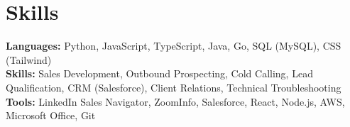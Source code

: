 \documentclass[11pt]{article}       %
\begin{document}

\vspace{-18.5pt}


\section*{Skills}
\textbf{Languages:} Python, JavaScript, TypeScript, Java, Go, SQL (MySQL), CSS (Tailwind)\\
\textbf{Skills:} Sales Development, Outbound Prospecting, Cold Calling, Lead Qualification, CRM (Salesforce), Client Relations, Technical Troubleshooting\\
\textbf{Tools:} LinkedIn Sales Navigator, ZoomInfo, Salesforce, React, Node.js, AWS, Microsoft Office, Git\\

\vspace{-6.5pt}
\end{document}
